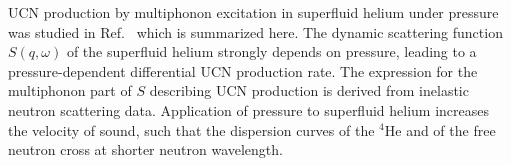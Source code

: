 
UCN production by multiphonon excitation in superfluid helium under
pressure was studied in Ref.~\cite{Schmidt2009} which is summarized
here. The dynamic scattering function $S(q,\omega)$ of the superfluid
helium strongly depends on pressure, leading to a pressure-dependent
differential UCN production rate. The expression for the multiphonon
part of $S$ describing UCN production is derived from inelastic
neutron scattering data.  Application of pressure to superfluid helium
increases the velocity of sound, such that the dispersion curves of
the $^4$He and of the free neutron cross at shorter neutron
wavelength.

